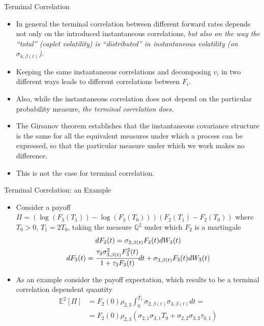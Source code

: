 \documentclass{beamer}
\begin{document}
\begin{frame}{Terminal Correlation}
\begin{itemize}
\item<1-> In general the terminal correlation between different forward rates depends not only on the introduced instantaneous correlations, \emph{but also on the way the “total” (caplet volatility) is “distributed” in instantaneous volatility (on $\sigma_{k,\beta(t)}$)}.
\item<1-> Keeping the same instantaneous correlations and decomposing $v_i$ in two different ways leads to different correlations between $F_i$. 
\item<2-> Also, while the instantaneous correlation does not depend on the particular probability measure, \emph{the terminal correlation does.} 
\item<3-> The Girsanov theorem establishes that the instantaneous covariance structure is the same for all the equivalent measures under which a process can be expressed, so that the particular measure under which we work makes no difference. 
\item<4-> This is not the case for terminal correlation. 
\end{itemize}
\end{frame}

\begin{frame}{Terminal Correlation: an Example}
\begin{itemize}
\item<1-> Consider a payoff $\Pi = (\log(F_3(T_1))-\log(F_3(T_0)))(F_2(T_1)-F_2(T_0))$ where $T_0>0$, $T_1=2T_0$, taking the measure $\mathbb{Q}^2$ under which $F_2$ is a martingale
\begin{equation*}
\begin{gathered}
dF_2(t) = \sigma_{2,\beta(t)}F_2(t)dW_2(t)\\
dF_3(t) = \cfrac{\tau_3\sigma^2_{3,\beta(t)}F_3^2(t)}{1+\tau_3F_3(t)}dt + \sigma_{3,\beta(t)}F_3(t)dW_3(t)
\end{gathered}
\end{equation*}
\item<2-> As an example consider the payoff expectation, which results to be a terminal correlation dependent quantity
\begin{equation}
\begin{aligned}
\mathbb{E}^2[\Pi] & = F_2(0)\rho_{2,3}\int_0^{T_1}\sigma_{2,\beta(t)}\sigma_{3,\beta(t)}dt = \\
&  = F_2(0)\rho_{2,3}(\sigma_{2,1}\sigma_{3,1}T_0+\sigma_{2,2}\sigma_{3,2}\tau_{0,1})
\end{aligned}
\label{eq:terminal_correlation_ex}
\end{equation}
\end{itemize}
\end{frame}
\end{document}
